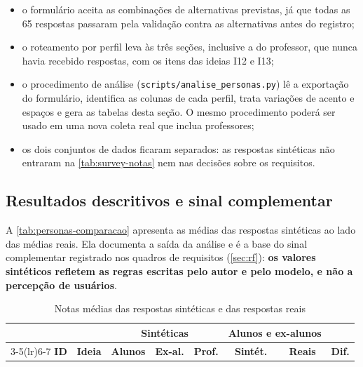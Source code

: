\begin{itemize}
  \item o formulário aceita as combinações de alternativas previstas, já
        que todas as 65 respostas passaram pela validação contra as
        alternativas antes do registro;
  \item o roteamento por perfil leva às três seções, inclusive a do
        professor, que nunca havia recebido respostas, com os itens das
        ideias I12 e I13;
  \item o procedimento de análise (\texttt{scripts/analise\_personas.py})
        lê a exportação do formulário, identifica as colunas de cada perfil,
        trata variações de acento e espaços e gera as tabelas desta seção.
        O mesmo procedimento poderá ser usado em uma nova coleta real que
        inclua professores;
  \item os dois conjuntos de dados ficaram separados: as respostas
        sintéticas não entraram na \autoref{tab:survey-notas} nem nas
        decisões sobre os requisitos.
\end{itemize}

\subsection{Resultados descritivos e sinal complementar}

A \autoref{tab:personas-comparacao} apresenta as médias das respostas
sintéticas ao lado das médias reais. Ela documenta a saída da análise e é
a base do sinal complementar registrado nos quadros de requisitos
(\autoref{sec:rf}): \textbf{os valores sintéticos refletem as regras
escritas pelo autor e pelo modelo, e não a percepção de usuários}.

\begin{table}[H]
  \centering
  \caption{Notas médias das respostas sintéticas e das respostas reais}
  \label{tab:personas-comparacao}
  \footnotesize
  \begin{tabular}{clcccccc}
    \toprule
    & & \multicolumn{3}{c}{\textbf{Sintéticas}} & \multicolumn{2}{c}{\textbf{Alunos e ex-alunos}} & \\
    \cmidrule(lr){3-5}\cmidrule(lr){6-7}
    \textbf{ID} & \textbf{Ideia} & \textbf{Alunos} & \textbf{Ex-al.} & \textbf{Prof.} & \textbf{Sintét.} & \textbf{Reais} & \textbf{Dif.} \\
    \midrule
  \end{tabular}
\end{table}

